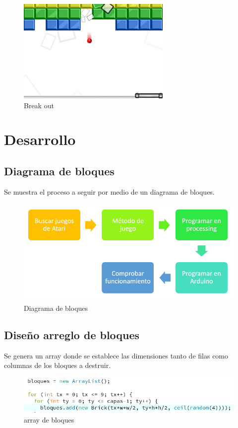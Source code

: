 \documentclass[10pt,a4paper]{article}
\begin{document}
\begin{multicols}{2}
\begin{figure}[H]
\centering
\includegraphics[scale=0.8]{brakout.jpg}
\caption{Break out }
\end{figure}
\end{multicols}


\section{Desarrollo}
\subsection{Diagrama de bloques}
Se muestra el proceso a seguir por medio de un diagrama de bloques.
\begin{figure}[H]
\centering
\includegraphics[scale=0.5]{proceso.PNG}
\caption{Diagrama de bloques}
\end{figure}




\subsection{Diseño arreglo de bloques}
Se genera un array donde se establece las dimensiones tanto de filas como columnas de los bloques a destruir. 

\begin{figure}[H]
\centering
\includegraphics[scale=0.5]{arreglo de bloques.PNG}
\caption{array de bloques}
\end{figure}
\end{document}
